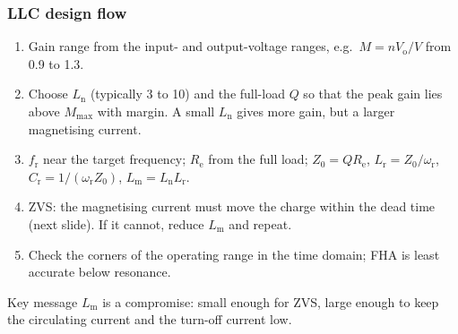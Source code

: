 \begin{frame}
	\frametitle{LLC design flow}
	\begin{enumerate}
		\item Gain range from the input- and output-voltage ranges, e.g.\ $M=nV_\mathrm{o}/V$ from 0.9 to 1.3.
		\item Choose $L_\mathrm{n}$ (typically 3 to 10) and the full-load $Q$ so that the peak gain lies above $M_\mathrm{max}$ with margin. A small $L_\mathrm{n}$ gives more gain, but a larger magnetising current.
		\item $f_\mathrm{r}$ near the target frequency; $R_\mathrm{e}$ from the full load; $Z_0=QR_\mathrm{e}$, $L_\mathrm{r}=Z_0/\omega_\mathrm{r}$, $C_\mathrm{r}=1/(\omega_\mathrm{r}Z_0)$, $L_\mathrm{m}=L_\mathrm{n}L_\mathrm{r}$.
		\item ZVS: the magnetising current must move the charge within the dead time (next slide). If it cannot, reduce $L_\mathrm{m}$ and repeat.
		\item Check the corners of the operating range in the time domain; FHA is least accurate below resonance.
	\end{enumerate}
	\begin{block}{Key message}
		$L_\mathrm{m}$ is a compromise: small enough for ZVS, large enough to keep the circulating current and the turn-off current low.
	\end{block}
\end{frame}


